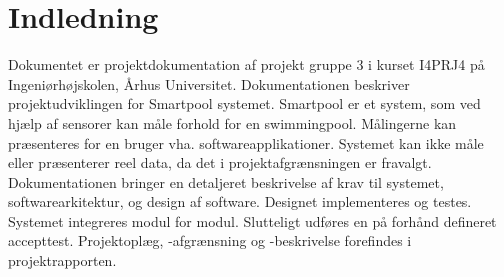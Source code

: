 \chapter{Indledning}


Dokumentet er projektdokumentation af projekt gruppe 3 i kurset I4PRJ4 på Ingeniørhøjskolen, Århus 
Universitet. Dokumentationen beskriver projektudviklingen for Smartpool systemet. 
Smartpool er et system, som ved hjælp af sensorer kan måle forhold for en swimmingpool. Målingerne kan 
præsenteres for en bruger vha. softwareapplikationer. Systemet kan ikke måle eller præsenterer reel data, da det i projektafgrænsningen er fravalgt. 
Dokumentationen bringer en detaljeret beskrivelse af krav til systemet, softwarearkitektur, og design af software. 
Designet implementeres og testes. Systemet integreres modul for modul. Slutteligt udføres en på forhånd defineret accepttest. 
Projektoplæg, -afgrænsning og -beskrivelse forefindes i projektrapporten. 